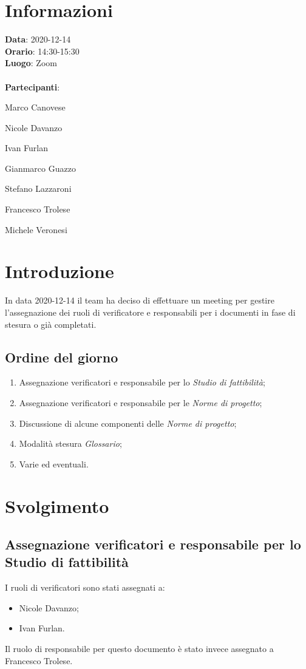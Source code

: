 \section{Informazioni}
\textbf{Data}: 2020-12-14\\
\textbf{Orario}: 14:30-15:30\\
\textbf{Luogo}: Zoom\\\\
\textbf{Partecipanti}:\begin{list}{*}{\setlength{\itemsep}{0cm}}
	\item Marco Canovese
	\item Nicole Davanzo
	\item Ivan Furlan
	\item Gianmarco Guazzo
	\item Stefano Lazzaroni
	\item Francesco Trolese
	\item Michele Veronesi
\end{list}

\section{Introduzione}
In data 2020-12-14 il team ha deciso di effettuare un meeting per gestire l'assegnazione dei ruoli di verificatore e responsabili per i documenti in fase di stesura o già completati.

\subsection{Ordine del giorno}
\begin{enumerate}
    \item Assegnazione verificatori e responsabile per lo \textit{Studio di fattibilità};
    \item Assegnazione verificatori e responsabile per le \textit{Norme di progetto};
    \item Discussione di alcune componenti delle \textit{Norme di progetto};
    \item Modalità stesura \textit{Glossario};
    \item Varie ed eventuali.
\end{enumerate}

\section{Svolgimento}
	\subsection{Assegnazione verificatori e responsabile per lo Studio di fattibilità}
	I ruoli di verificatori sono stati assegnati a:
	\begin{itemize}
		\item Nicole Davanzo;
		\item Ivan Furlan.
	\end{itemize}
	Il ruolo di responsabile per questo documento è stato invece assegnato a Francesco Trolese.


